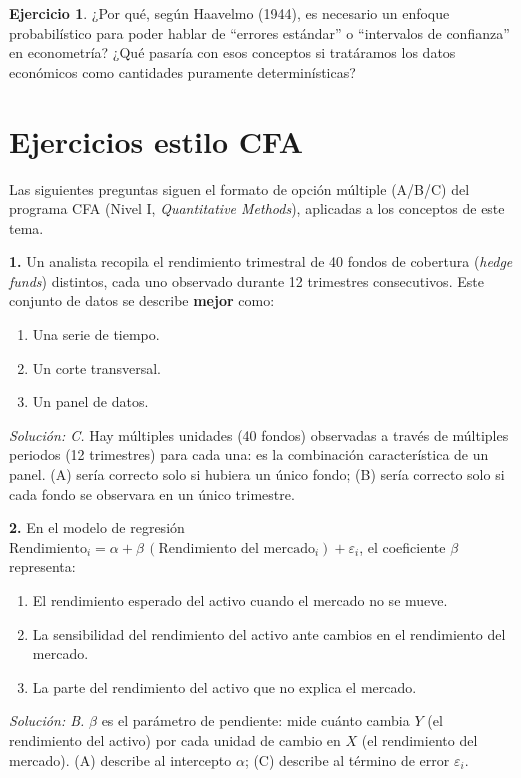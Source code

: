 \documentclass[11pt,a4paper,oneside]{article}
\theoremstyle{definition}
\newtheorem{exercise}[definition]{Ejercicio}
\begin{document}
\begin{exercise}
¿Por qué, según Haavelmo (1944), es necesario un enfoque probabilístico para
poder hablar de ``errores estándar'' o ``intervalos de confianza'' en
econometría? ¿Qué pasaría con esos conceptos si tratáramos los datos
económicos como cantidades puramente determinísticas?
\end{exercise}

\section{Ejercicios estilo CFA}

Las siguientes preguntas siguen el formato de opción múltiple (A/B/C) del
programa CFA (Nivel I, \emph{Quantitative Methods}), aplicadas a los
conceptos de este tema.

\begin{cfaBox}
\textbf{1.} Un analista recopila el rendimiento trimestral de 40 fondos de
cobertura (\emph{hedge funds}) distintos, cada uno observado durante 12
trimestres consecutivos. Este conjunto de datos se describe \textbf{mejor}
como:
\begin{enumerate}[label=\Alph*.]
\item Una serie de tiempo.
\item Un corte transversal.
\item Un panel de datos.
\end{enumerate}
\end{cfaBox}
\emph{Solución: C.} Hay múltiples unidades (40 fondos) observadas a través
de múltiples periodos (12 trimestres) para cada una: es la combinación
característica de un panel. (A) sería correcto solo si hubiera un único
fondo; (B) sería correcto solo si cada fondo se observara en un único
trimestre.

\begin{cfaBox}
\textbf{2.} En el modelo de regresión $\text{Rendimiento}_{i} = \alpha + \beta\,(\text{Rendimiento del mercado}_i) + \varepsilon_i$,
el coeficiente $\beta$ representa:
\begin{enumerate}[label=\Alph*.]
\item El rendimiento esperado del activo cuando el mercado no se mueve.
\item La sensibilidad del rendimiento del activo ante cambios en el rendimiento del mercado.
\item La parte del rendimiento del activo que no explica el mercado.
\end{enumerate}
\end{cfaBox}
\emph{Solución: B.} $\beta$ es el parámetro de pendiente: mide cuánto cambia
$Y$ (el rendimiento del activo) por cada unidad de cambio en $X$ (el
rendimiento del mercado). (A) describe al intercepto $\alpha$; (C) describe
al término de error $\varepsilon_i$.
\end{document}
